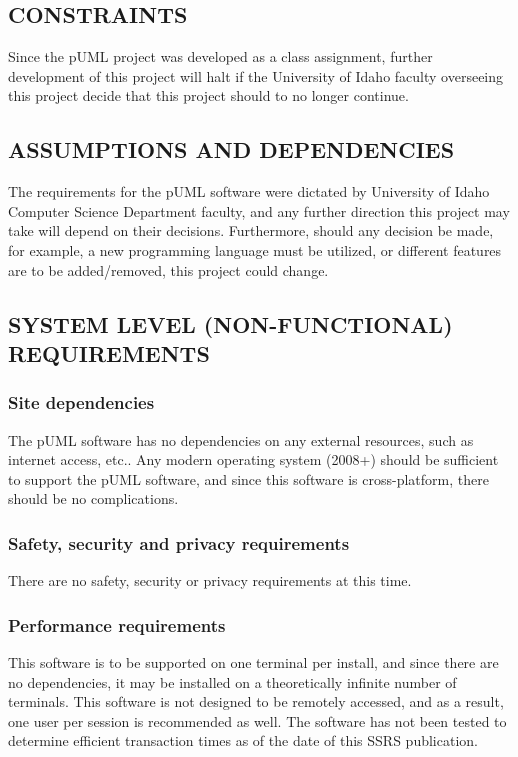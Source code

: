 \documentclass[twoside,letterpaper]{article}
\begin{document}
\subsection[CONSTRAINTS]{\rmfamily\bfseries
CONSTRAINTS}
{
Since the pUML project was developed as a class assignment,
further development of this project will halt if the University of Idaho
faculty overseeing this project decide that this project should to no longer continue.
}

\subsection[ASSUMPTIONS AND DEPENDENCIES]{\rmfamily\bfseries
ASSUMPTIONS AND DEPENDENCIES}
{
The requirements for the pUML software were dictated by University of Idaho Computer Science
Department faculty, and any further direction this project may take will depend on their decisions.  
Furthermore, should any decision be made, for example,  a new programming language must be utilized,
or different features are to be added/removed, this project could change.
}




\subsection[SYSTEM LEVEL (NON{}-FUNCTIONAL)
REQUIREMENTS]{\rmfamily\bfseries
SYSTEM LEVEL (NON-FUNCTIONAL) REQUIREMENTS}

\subsubsection[Site dependencies]{\rmfamily\bfseries
Site dependencies}
{
The pUML software has no dependencies on any external resources, such as internet access, etc..
Any modern operating system (2008+) should be sufficient to support the pUML software,
and since this software is cross-platform, there should be no complications.
}

\subsubsection[Safety, security and privacy requirements]{\rmfamily\bfseries
Safety, security and privacy requirements}
{
There are no safety, security or privacy requirements at this time.
}

\subsubsection[Performance requirements]{\rmfamily\bfseries
Performance requirements}
{
This software is to be supported on one terminal per install, and since there are no dependencies,
it may be installed on a theoretically infinite number of terminals. This software is not designed to
be remotely accessed, and as a result, one user per session is recommended as well.
The software has not been tested to determine efficient transaction times as of the date of this SSRS publication.
}
\end{document}
